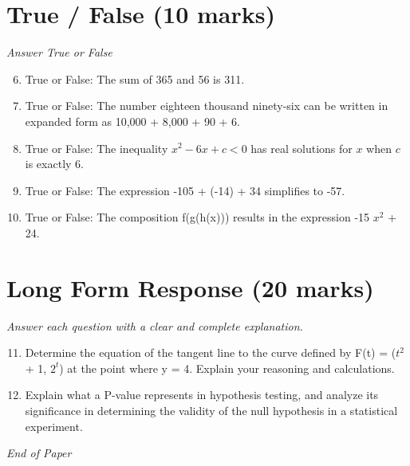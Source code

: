 \documentclass[12pt]{article}
\begin{document}
\section*{True / False (10 marks)}
\textit{Answer True or False}
\begin{enumerate}[label=\arabic*.]
\setcounter{enumi}{5}
\item True or False: The sum of 365 and 56 is 311.
\item True or False: The number eighteen thousand ninety-six can be written in expanded form as 10,000 + 8,000 + 90 + 6.
\item True or False: The inequality $x^2 - 6 x + c < 0$ has real solutions for $x$ when $c$ is exactly $6$.
\item True or False: The expression -105 + (-14) + 34 simplifies to -57.
\item True or False: The composition f(g(h(x))) results in the expression -15 $x^2$ + 24.
\end{enumerate}

\section*{Long Form Response (20 marks)}
\textit{Answer each question with a clear and complete explanation.}
\begin{enumerate}[label=\arabic*.]
\setcounter{enumi}{10}
\item Determine the equation of the tangent line to the curve defined by F(t) = ($t^2$ + 1, $2^t$) at the point where y = 4. Explain your reasoning and calculations.
\item Explain what a P-value represents in hypothesis testing, and analyze its significance in determining the validity of the null hypothesis in a statistical experiment.
\end{enumerate}

\vfill
\noindent\textit{End of Paper}
\end{document}
